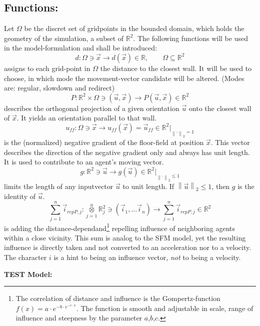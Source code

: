 \subsection*{Functions:}
%
Let $\Omega$ be the discret set of gridpoints in the bounded domain, which holds the geometry of the simulation, a subset of $\mathbb{R}^{2}$. The following functions will be used in the model-formulation and shall be introduced:
\[  d  : \Omega \ni \vec{x}  \longrightarrow d(\vec{x}) \in \mathbb{R}, \qquad \Omega \subseteq \mathbb{R}^{2} \]
assigns to each grid-point in $\Omega$ the distance to the closest wall. It will be used to choose, in which mode the movement-vector candidate will be altered. (Modes are: regular, slowdown and redirect)
\[  P  : \mathbb{R}^2 \times \Omega  \ni (\vec{u}, \vec{x})  \longrightarrow  P(\vec{u}, \vec{x}) \in \mathbb{R}^2 \]
describes the orthogonal projection of a given orientation $\vec{u}$ onto the closest wall of $\vec{x}$. It yields an orientation parallel to that wall.
\[ u_{ff} : \Omega \ni \vec{x} \longrightarrow u_{ff}(\vec{x}) = \vec{u}_{ff} \in \mathbb{R}^{2}|_{\left\lVert \cdot \right\rVert_2 = 1} \]
is the (normalized) negative gradient of the floor-field at position $\vec{x}$. This vector describes the direction of the negative gradient only and always has unit length. It is used to contribute to an agent's moving vector.
\[ g : \mathbb{R}^2 \ni \vec{u} \longrightarrow g(\vec{u}) \in \mathbb{R}^{2}|_{\left\lVert \cdot \right\rVert_2 \leq 1}  \]
limits the length of any inputvector $\vec{u}$ to unit length. If $\left\lVert \vec{u} \right\rVert_2 \leq 1$, then $g$ is the identity of $\vec{u}$.
\[ \sum_{j=1}^{n}\vec{i}_{repP,j} : \overset{n}{\underset{j=1}{\otimes}} \mathbb{R}^2_j \ni (\vec{i}_1, ... \vec{i}_n) \longrightarrow  \sum_{j=1}^{n}\vec{i}_{repP,j} \in \mathbb{R}^{2} \]
is adding the distance-dependand\footnote{The correlation of distance and influence is the Gompertz-function $f(x)=a \cdot e^{-b\cdot e^{-c \cdot x}}$. The function is smooth and adjustable in scale, range of influence and steepness by the parameter $a$,$b$,$c$.} repelling influence of neighboring agents within a close vicinity. This sum is analog to the SFM model, yet the resulting influence is directly taken and not converted to an acceleration nor to a velocity. The character $i$ is a hint to being an influence vector, \emph{not} to being a velocity.
%
\begin{center}
\textbf{TEST Model:}\\
\end{center}

